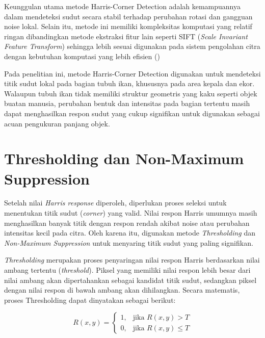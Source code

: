 Keunggulan utama metode Harris-Corner Detection adalah kemampuannya dalam mendeteksi sudut secara stabil terhadap perubahan rotasi dan gangguan noise lokal.
Selain itu, metode ini memiliki kompleksitas komputasi yang relatif ringan dibandingkan metode ekstraksi fitur lain seperti SIFT (\emph{Scale Invariant Feature Transform}) sehingga lebih sesuai digunakan pada sistem pengolahan citra dengan kebutuhan komputasi yang lebih efisien (\cite{Lowe2004})

Pada penelitian ini, metode Harris-Corner Detection digunakan untuk mendeteksi titik sudut lokal pada bagian tubuh ikan, khususnya pada area kepala dan ekor. 
Walaupun tubuh ikan tidak memiliki struktur geometris yang kaku seperti objek buatan manusia, perubahan bentuk dan intensitas pada bagian tertentu masih dapat menghasilkan respon sudut yang cukup signifikan untuk digunakan sebagai acuan pengukuran panjang objek.


\section{Thresholding dan Non-Maximum Suppression}

Setelah nilai \textit{Harris response} diperoleh, diperlukan proses seleksi untuk menentukan titik sudut (\textit{corner}) yang valid. Nilai respon Harris umumnya masih menghasilkan banyak titik dengan respon rendah akibat noise atau perubahan intensitas kecil pada citra. Oleh karena itu, digunakan metode \textit{Thresholding} dan \textit{Non-Maximum Suppression} untuk menyaring titik sudut yang paling signifikan.

\textit{Thresholding} merupakan proses penyaringan nilai respon Harris berdasarkan nilai ambang tertentu (\textit{threshold}). Piksel yang memiliki nilai respon lebih besar dari nilai ambang akan dipertahankan sebagai kandidat titik sudut, sedangkan piksel dengan nilai respon di bawah ambang akan dihilangkan. Secara matematis, proses Thresholding dapat dinyatakan sebagai berikut:

\[
R(x,y) =
\begin{cases}
1, & \text{jika } R(x,y) > T \\
0, & \text{jika } R(x,y) \leq T
\end{cases}
\]

